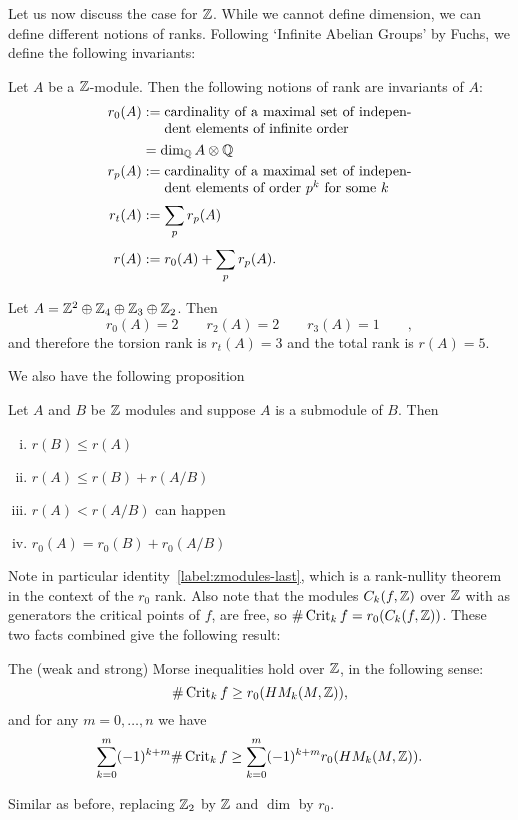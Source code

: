 Let us now discuss the case for $\Z$.
While we cannot define dimension, we can define different notions of ranks. Following `Infinite Abelian Groups' by Fuchs, we define the following invariants:
\begin{definition}[Rank]
    Let $A$ be a  $\Z$-module. Then the following notions of rank are invariants of $A$:
    \begin{align*}
        r_0(A) &:= \parbox[t]{6.2cm}{cardinality of a maximal set of independent elements of infinite order}\\[0.3em]
            &= \dim_{\Q} A \otimes \Q\\
        r_p(A) &:= \parbox[t]{6.2cm}{cardinality of a maximal set of independent elements of order $p^{k}$ for some $k$}\\[0.3em]
        r_t(A) &:= \sum_{p} r_p(A)\\[0.3em]
        r(A) &:= r_0(A) + \sum_{p}r_p(A)
    .\end{align*}
\end{definition}
\begin{eg}
    Let $A = \Z^2 \oplus \Z_4 \oplus \Z_3 \oplus \Z_2$.
    Then
    \[
        r_0(A) = 2 \qquad
        r_2(A) = 2 \qquad
        r_3(A) = 1 \qquad
    ,\]
    and therefore the torsion rank is $r_t(A) = 3$ and the total rank is $r(A) = 5$.
\end{eg}
We also have the following proposition
\begin{lemma}
    Let $A$ and $B$ be $\Z$ modules and suppose $A$ is  a submodule of $B$.
    Then
    \begin{enumerate}[(i)]
        \item $r(B) \le  r(A)$
        \item $r(A) \le  r(B) + r(A / B)$
        \item $r(A) < r(A / B)$ can happen
        \item  $ r_0(A) = r_0(B) + r_0(A/B)$ \label{label:zmodules-last}
    \end{enumerate}
\end{lemma}

Note in particular identity~\ref{label:zmodules-last}, which is a rank-nullity theorem in the context of the $r_0$ rank.
Also note that the modules $C_k(f, \Z)$ over $\Z$ with as generators the critical points of $f$, are free, so $\# \Crit_k f =r_0(C_k(f, \Z))$.
These two facts combined give the following result:
\begin{prop}
    The (weak and strong) Morse inequalities hold over $\Z$, in the following sense:
    \[
        \# \Crit_k f \ge  r_0(\HMf[k]{M, \Z})
    ,\]
    and for any $m = 0, \ldots, n$ we have
        \[
            \sum_{k=0}^{m} (-1)^{k+m} \# \Crit_k f \ge  \sum_{k=0}^{m} (-1)^{k+m} r_0(\HMf[k]{M, \Z})
        .\]
\end{prop}
\begin{myproof}
    Similar as before, replacing $\Z_2$ by $\Z$ and $\dim$ by $r_0$.
\end{myproof}

